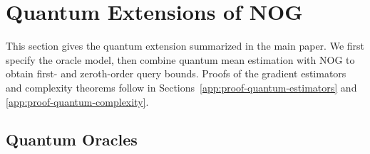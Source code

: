	\section{Quantum Extensions of NOG}\label{app:quantum}

	This section gives the quantum extension summarized in the main paper.  We
	first specify the oracle model, then combine quantum mean estimation with NOG
	to obtain first- and zeroth-order query bounds.  Proofs of the gradient
	estimators and complexity theorems follow in
	Sections~\ref{app:proof-quantum-estimators} and
	\ref{app:proof-quantum-complexity}.

	\subsection{Quantum Oracles}

